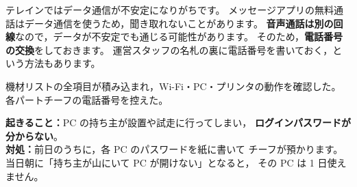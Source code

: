 \begin{Note}
テレインではデータ通信が不安定になりがちです。
メッセージアプリの無料通話はデータ通信を使うため，聞き取れないことがあります。
\textbf{音声通話は別の回線}なので，データが不安定でも通じる可能性があります。
そのため，\textbf{電話番号の交換}をしておきます。
運営スタッフの名札の裏に電話番号を書いておく，という方法もあります。
\end{Note}

\begin{Done}
機材リストの全項目が積み込まれ，Wi-Fi・PC・プリンタの動作を確認した。
各パートチーフの電話番号を控えた。
\end{Done}

\begin{Fail}
\textbf{起きること：}PC の持ち主が設置や試走に行ってしまい，
\textbf{ログインパスワードが分からない}。\\
\textbf{対処：}前日のうちに，各 PC のパスワードを紙に書いて
チーフが預かります。当日朝に「持ち主が山にいて PC が開けない」となると，
その PC は 1 日使えません。
\end{Fail}
